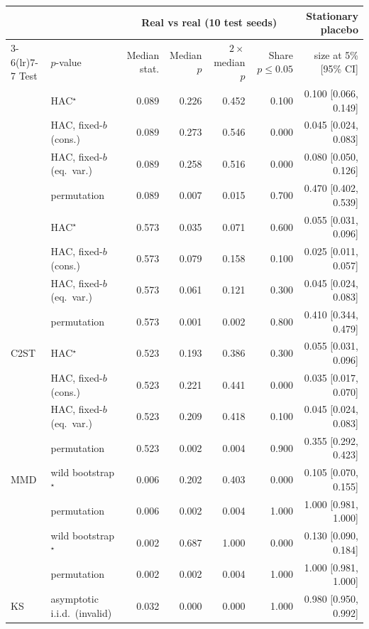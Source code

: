 \begin{tabular}{llrrrrr}
\toprule
 & & \multicolumn{4}{c}{Real \TEST{} vs real \TRAIN{} (10 test seeds)} & Stationary placebo \\
\cmidrule(lr){3-6}\cmidrule(lr){7-7}
Test & $p$-value & Median stat. & Median $p$ & $2\times$median $p$ & Share $p\le0.05$ & size at 5\% [95\% CI] \\
\midrule
\WC{} & HAC$^{\star}$ & 0.089 & 0.226 & 0.452 & 0.100 & 0.100 [0.066, 0.149] \\
 & HAC, fixed-$b$ (cons.) & 0.089 & 0.273 & 0.546 & 0.000 & 0.045 [0.024, 0.083] \\
 & HAC, fixed-$b$ (eq.\ var.) & 0.089 & 0.258 & 0.516 & 0.000 & 0.080 [0.050, 0.126] \\
 & permutation & 0.089 & 0.007 & 0.015 & 0.700 & 0.470 [0.402, 0.539] \\
\addlinespace
\LRC{} & HAC$^{\star}$ & 0.573 & 0.035 & 0.071 & 0.600 & 0.055 [0.031, 0.096] \\
 & HAC, fixed-$b$ (cons.) & 0.573 & 0.079 & 0.158 & 0.100 & 0.025 [0.011, 0.057] \\
 & HAC, fixed-$b$ (eq.\ var.) & 0.573 & 0.061 & 0.121 & 0.300 & 0.045 [0.024, 0.083] \\
 & permutation & 0.573 & 0.001 & 0.002 & 0.800 & 0.410 [0.344, 0.479] \\
\addlinespace
C2ST & HAC$^{\star}$ & 0.523 & 0.193 & 0.386 & 0.300 & 0.055 [0.031, 0.096] \\
 & HAC, fixed-$b$ (cons.) & 0.523 & 0.221 & 0.441 & 0.000 & 0.035 [0.017, 0.070] \\
 & HAC, fixed-$b$ (eq.\ var.) & 0.523 & 0.209 & 0.418 & 0.100 & 0.045 [0.024, 0.083] \\
 & permutation & 0.523 & 0.002 & 0.004 & 0.900 & 0.355 [0.292, 0.423] \\
\addlinespace
MMD & wild bootstrap$^{\star}$ & 0.006 & 0.202 & 0.403 & 0.000 & 0.105 [0.070, 0.155] \\
 & permutation & 0.006 & 0.002 & 0.004 & 1.000 & 1.000 [0.981, 1.000] \\
\addlinespace
\SigMMD{} & wild bootstrap$^{\star}$ & 0.002 & 0.687 & 1.000 & 0.000 & 0.130 [0.090, 0.184] \\
 & permutation & 0.002 & 0.002 & 0.004 & 1.000 & 1.000 [0.981, 1.000] \\
\addlinespace
KS & asymptotic i.i.d.\ (invalid) & 0.032 & 0.000 & 0.000 & 1.000 & 0.980 [0.950, 0.992] \\
\bottomrule
\end{tabular}
